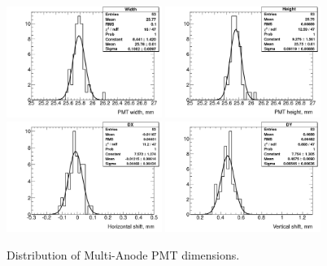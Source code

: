 \documentclass[a4paper,11pt]{article}
\begin{document}
\begin{figure}[h]
 \centering
 \includegraphics[width=0.45\textwidth]{./mapmt_width}
 \includegraphics[width=0.45\textwidth]{./mapmt_height}\\
 \includegraphics[width=0.45\textwidth]{./mapmt_horizontal_shift}
 \includegraphics[width=0.45\textwidth]{./mapmt_vertical_shift}
 \caption[Distribution of Multi-Anode PMT dimensions]{Distribution of Multi-Anode PMT dimensions.}
 \label{fig:mapmt_dimensions}
\end{figure}
\end{document}
